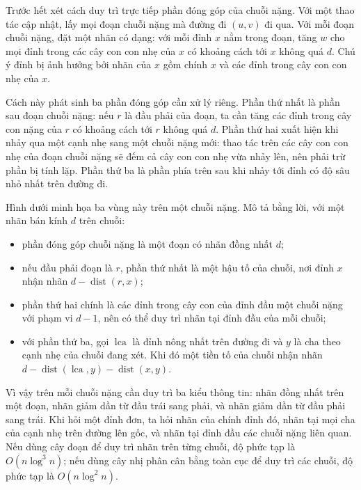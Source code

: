 \documentclass[11pt]{article}
\begin{document}
Trước hết xét cách duy trì trực tiếp phần đóng góp của chuỗi nặng. Với một
thao tác cập nhật, lấy mọi đoạn chuỗi nặng mà đường đi \((u,v)\) đi qua. Với
mỗi đoạn chuỗi nặng, đặt một nhãn có dạng: với mỗi đỉnh \(x\) nằm trong đoạn,
tăng \(w\) cho mọi đỉnh trong các cây con con nhẹ của \(x\) có khoảng cách tới
\(x\) không quá \(d\). Chú ý đỉnh bị ảnh hưởng bởi nhãn của \(x\) gồm chính
\(x\) và các đỉnh trong cây con con nhẹ của \(x\).

Cách này phát sinh ba phần đóng góp cần xử lý riêng. Phần thứ nhất là phần sau
đoạn chuỗi nặng: nếu \(r\) là đầu phải của đoạn, ta cần tăng các đỉnh trong
cây con nặng của \(r\) có khoảng cách tới \(r\) không quá \(d\). Phần thứ hai
xuất hiện khi nhảy qua một cạnh nhẹ sang một chuỗi nặng mới: thao tác trên các
cây con con nhẹ của đoạn chuỗi nặng sẽ đếm cả cây con con nhẹ vừa nhảy lên,
nên phải trừ phần bị tính lặp. Phần thứ ba là phần phía trên sau khi nhảy tới
đỉnh có độ sâu nhỏ nhất trên đường đi.

Hình dưới minh họa ba vùng này trên một chuỗi nặng. Mô tả bằng lời, với một
nhãn bán kính \(d\) trên chuỗi:


\begin{itemize}
  \item phần đóng góp chuỗi nặng là một đoạn có nhãn đồng nhất \(d\);
  \item nếu đầu phải đoạn là \(r\), phần thứ nhất là một hậu tố của chuỗi, nơi
  đỉnh \(x\) nhận nhãn \(d-\operatorname{dist}(r,x)\);
  \item phần thứ hai chính là các đỉnh trong cây con của đỉnh đầu một chuỗi
  nặng với phạm vi \(d-1\), nên có thể duy trì nhãn tại đỉnh đầu của mỗi chuỗi;
  \item với phần thứ ba, gọi \(\operatorname{lca}\) là đỉnh nông nhất trên
  đường đi và \(y\) là cha theo cạnh nhẹ của chuỗi đang xét. Khi đó một tiền tố
  của chuỗi nhận nhãn
  \(d-\operatorname{dist}(\operatorname{lca},y)-\operatorname{dist}(x,y)\).
\end{itemize}

Vì vậy trên mỗi chuỗi nặng cần duy trì ba kiểu thông tin: nhãn đồng nhất trên
một đoạn, nhãn giảm dần từ đầu trái sang phải, và nhãn giảm dần từ đầu phải
sang trái. Khi hỏi một đỉnh đơn, ta hỏi nhãn của chính đỉnh đó, nhãn tại mọi
cha của cạnh nhẹ trên đường lên gốc, và nhãn tại đỉnh đầu các chuỗi nặng liên
quan. Nếu dùng cây đoạn để duy trì nhãn trên từng chuỗi, độ phức tạp là
\(O(n\log^3 n)\); nếu dùng cây nhị phân cân bằng toàn cục để duy trì các chuỗi,
độ phức tạp là \(O(n\log^2 n)\).
\end{document}
